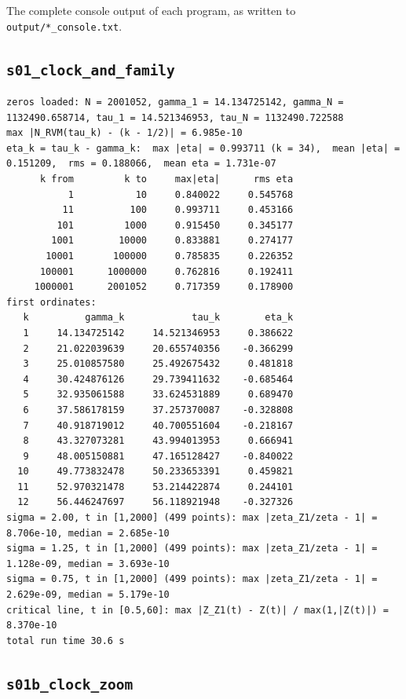 \documentclass[11pt,reqno]{amsart}
\numberwithin{equation}{section}
\theoremstyle{plain}
\theoremstyle{definition}
\theoremstyle{remark}
\begin{document}
The complete console output of each program, as written to \texttt{output/*\_console.txt}.

\subsection{\texttt{s01\_clock\_and\_family}}
\label{app:out-s01-clock-and-family}

\begin{lstlisting}[style=out]
zeros loaded: N = 2001052, gamma_1 = 14.134725142, gamma_N = 1132490.658714, tau_1 = 14.521346953, tau_N = 1132490.722588
max |N_RVM(tau_k) - (k - 1/2)| = 6.985e-10
eta_k = tau_k - gamma_k:  max |eta| = 0.993711 (k = 34),  mean |eta| = 0.151209,  rms = 0.188066,  mean eta = 1.731e-07
      k from         k to     max|eta|      rms eta
           1           10     0.840022     0.545768
          11          100     0.993711     0.453166
         101         1000     0.915450     0.345177
        1001        10000     0.833881     0.274177
       10001       100000     0.785835     0.226352
      100001      1000000     0.762816     0.192411
     1000001      2001052     0.717359     0.178900
first ordinates:
   k          gamma_k            tau_k        eta_k
   1     14.134725142     14.521346953     0.386622
   2     21.022039639     20.655740356    -0.366299
   3     25.010857580     25.492675432     0.481818
   4     30.424876126     29.739411632    -0.685464
   5     32.935061588     33.624531889     0.689470
   6     37.586178159     37.257370087    -0.328808
   7     40.918719012     40.700551604    -0.218167
   8     43.327073281     43.994013953     0.666941
   9     48.005150881     47.165128427    -0.840022
  10     49.773832478     50.233653391     0.459821
  11     52.970321478     53.214422874     0.244101
  12     56.446247697     56.118921948    -0.327326
sigma = 2.00, t in [1,2000] (499 points): max |zeta_Z1/zeta - 1| = 8.706e-10, median = 2.685e-10
sigma = 1.25, t in [1,2000] (499 points): max |zeta_Z1/zeta - 1| = 1.128e-09, median = 3.693e-10
sigma = 0.75, t in [1,2000] (499 points): max |zeta_Z1/zeta - 1| = 2.629e-09, median = 5.179e-10
critical line, t in [0.5,60]: max |Z_Z1(t) - Z(t)| / max(1,|Z(t)|) = 8.370e-10
total run time 30.6 s
\end{lstlisting}

\subsection{\texttt{s01b\_clock\_zoom}}
\label{app:out-s01b-clock-zoom}
\end{document}
